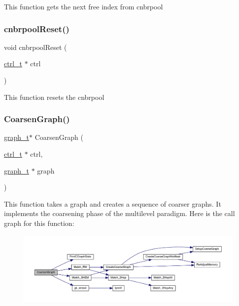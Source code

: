 This function gets the next free index from cnbrpool \mbox{\label{a00945_ab24df9968589b0cfabb8f1a8b4661d0d}} 
\subsubsection{\texorpdfstring{cnbrpool\+Reset()}{cnbrpoolReset()}}
{\footnotesize\ttfamily void cnbrpool\+Reset (\begin{DoxyParamCaption}\item[{\hyperlink{a00742}{ctrl\+\_\+t} $\ast$}]{ctrl }\end{DoxyParamCaption})}

This function resets the cnbrpool \mbox{\label{a00945_adeb2c7c9bffbeca00fcc97854fb88ada}} 
\subsubsection{\texorpdfstring{Coarsen\+Graph()}{CoarsenGraph()}}
{\footnotesize\ttfamily \hyperlink{a00734}{graph\+\_\+t}$\ast$ Coarsen\+Graph (\begin{DoxyParamCaption}\item[{\hyperlink{a00742}{ctrl\+\_\+t} $\ast$}]{ctrl,  }\item[{\hyperlink{a00734}{graph\+\_\+t} $\ast$}]{graph }\end{DoxyParamCaption})}

This function takes a graph and creates a sequence of coarser graphs. It implements the coarsening phase of the multilevel paradigm. Here is the call graph for this function\+:\nopagebreak
\begin{figure}[H]
\begin{center}
\leavevmode
\includegraphics[width=350pt]{a00945_adeb2c7c9bffbeca00fcc97854fb88ada_cgraph}
\end{center}
\end{figure}
\mbox{\label{a00945_afa83320e3b311e0feef90d0bf4303716}} 
